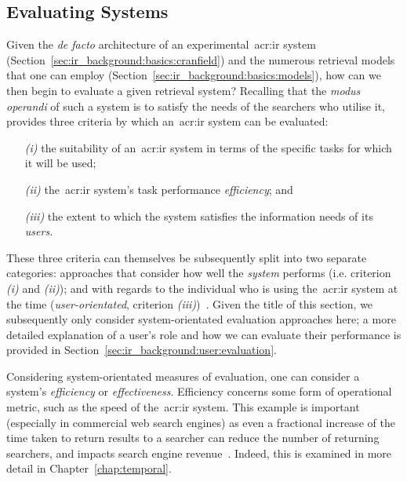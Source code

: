 \subsection{Evaluating Systems}\label{sec:ir_background:evaluation}
Given the \emph{de facto} architecture of an experimental~\gls{acr:ir} system (Section~\ref{sec:ir_background:basics:cranfield}) and the numerous retrieval models that one can employ (Section~\ref{sec:ir_background:basics:models}), how can we then begin to evaluate a given retrieval system? Recalling that the \emph{modus operandi} of such a system is to satisfy the needs of the searchers who utilise it,~\cite{lancaster1968information} provides three criteria by which an~\gls{acr:ir} system can be evaluated:

\begin{itemize}
    \item[\emph{(i)}]{the suitability of an~\gls{acr:ir} system in terms of the specific tasks for which it will be used;}
    \item[\emph{(ii)}]{the~\gls{acr:ir} system's task performance \emph{efficiency}; and}
    \item[\emph{(iii)}]{the extent to which the system satisfies the information needs of its \emph{users.}}
\end{itemize}

These three criteria can themselves be subsequently split into two separate categories: approaches that consider how well the \emph{system} performs (i.e. criterion \emph{(i)} and \emph{(ii)}); and with regards to the individual who is using the~\gls{acr:ir} system at the time (\emph{user-orientated}, criterion \emph{(iii)})~\citep{voorhees2005trec_book}. Given the title of this section, we subsequently only consider system-orientated evaluation approaches here; a more detailed explanation of a user's role and how we can evaluate their performance is provided in Section~\ref{sec:ir_background:user:evaluation}.

Considering system-orientated measures of evaluation, one can consider a system's \emph{efficiency} or \emph{effectiveness}. Efficiency concerns some form of operational metric, such as the speed of the~\gls{acr:ir} system. This example is important (especially in commercial web search engines) as even a fractional increase of the time taken to return results to a searcher can reduce the number of returning searchers, and impacts search engine revenue~\citep{brutlag2009speed}. Indeed, this is examined in more detail in Chapter~\ref{chap:temporal}.


